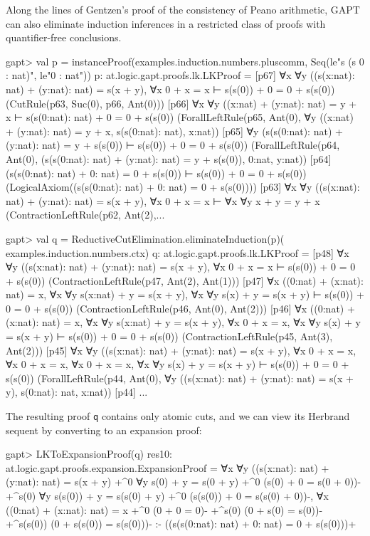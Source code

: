 \documentclass[a4paper,11pt]{book}
\begin{document}
Along the lines of Gentzen's proof of the consistency of Peano arithmetic,
GAPT can also eliminate induction inferences in a restricted class of proofs
with quantifier-free conclusions.

\begin{clilisting}
gapt> val p = instanceProof(examples.induction.numbers.pluscomm,                                     Seq(le"s (s 0 : nat)", le"0 : nat"))
p: at.logic.gapt.proofs.lk.LKProof =
[p67] ∀x ∀y ((s(x:nat): nat) + (y:nat): nat) = s(x + y),
∀x 0 + x = x
⊢
s(s(0)) + 0 = 0 + s(s(0))    (CutRule(p63, Suc(0), p66, Ant(0)))
[p66] ∀x ∀y ((x:nat) + (y:nat): nat) = y + x ⊢ s(s(0:nat): nat) + 0 = 0 + s(s(0))    (ForallLeftRule(p65, Ant(0), ∀y ((x:nat) + (y:nat): nat) = y + x, s(s(0:nat): nat), x:nat))
[p65] ∀y (s(s(0:nat): nat) + (y:nat): nat) = y + s(s(0)) ⊢ s(s(0)) + 0 = 0 + s(s(0))    (ForallLeftRule(p64, Ant(0), (s(s(0:nat): nat) + (y:nat): nat) = y + s(s(0)), 0:nat, y:nat))
[p64] (s(s(0:nat): nat) + 0: nat) = 0 + s(s(0)) ⊢ s(s(0)) + 0 = 0 + s(s(0))    (LogicalAxiom((s(s(0:nat): nat) + 0: nat) = 0 + s(s(0))))
[p63] ∀x ∀y ((s(x:nat): nat) + (y:nat): nat) = s(x + y),
∀x 0 + x = x
⊢
∀x ∀y x + y = y + x    (ContractionLeftRule(p62, Ant(2),...

gapt> val q = ReductiveCutElimination.eliminateInduction(p)(                                         examples.induction.numbers.ctx)
q: at.logic.gapt.proofs.lk.LKProof =
[p48] ∀x ∀y ((s(x:nat): nat) + (y:nat): nat) = s(x + y),
∀x 0 + x = x
⊢
s(s(0)) + 0 = 0 + s(s(0))    (ContractionLeftRule(p47, Ant(2), Ant(1)))
[p47] ∀x ((0:nat) + (x:nat): nat) = x,
∀x ∀y s(x:nat) + y = s(x + y),
∀x ∀y s(x) + y = s(x + y)
⊢
s(s(0)) + 0 = 0 + s(s(0))    (ContractionLeftRule(p46, Ant(0), Ant(2)))
[p46] ∀x ((0:nat) + (x:nat): nat) = x,
∀x ∀y s(x:nat) + y = s(x + y),
∀x 0 + x = x,
∀x ∀y s(x) + y = s(x + y)
⊢
s(s(0)) + 0 = 0 + s(s(0))    (ContractionLeftRule(p45, Ant(3), Ant(2)))
[p45] ∀x ∀y ((s(x:nat): nat) + (y:nat): nat) = s(x + y),
∀x 0 + x = x,
∀x 0 + x = x,
∀x 0 + x = x,
∀x ∀y s(x) + y = s(x + y)
⊢
s(s(0)) + 0 = 0 + s(s(0))    (ForallLeftRule(p44, Ant(0), ∀y ((s(x:nat): nat) + (y:nat): nat) = s(x + y), s(0:nat): nat, x:nat))
[p44] ...

\end{clilisting}

The resulting proof \texttt{q} contains only atomic cuts, and we can view its Herbrand
sequent by converting to an expansion proof:

\begin{clilisting}
gapt> LKToExpansionProof(q)
res10: at.logic.gapt.proofs.expansion.ExpansionProof =
∀x ∀y ((s(x:nat): nat) + (y:nat): nat) = s(x + y)
  +^{0} ∀y s(0) + y = s(0 + y) +^{0} (s(0) + 0 = s(0 + 0))-
  +^{s(0)} ∀y s(s(0)) + y = s(s(0) + y) +^{0} (s(s(0)) + 0 = s(s(0) + 0))-,
∀x ((0:nat) + (x:nat): nat) = x
  +^{0} (0 + 0 = 0)-
  +^{s(0)} (0 + s(0) = s(0))-
  +^{s(s(0))} (0 + s(s(0)) = s(s(0)))-
:-
((s(s(0:nat): nat) + 0: nat) = 0 + s(s(0)))+

\end{clilisting}
\end{document}
